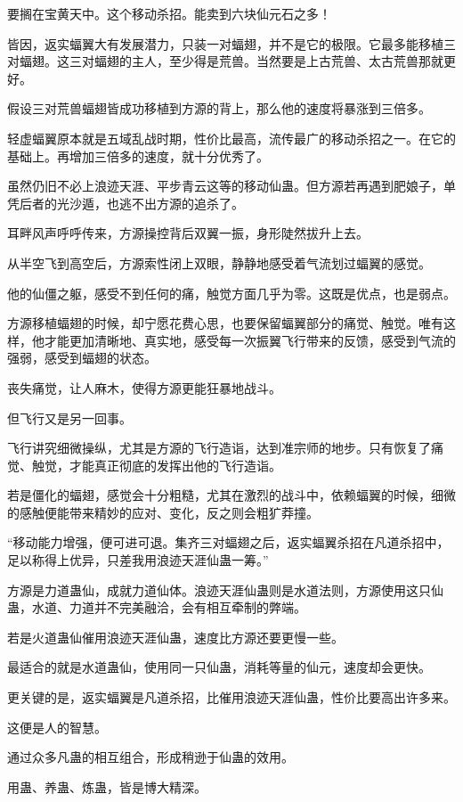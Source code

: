 \begin{this_body}
要搁在宝黄天中。这个移动杀招。能卖到六块仙元石之多！

皆因，返实蝠翼大有发展潜力，只装一对蝠翅，并不是它的极限。它最多能移植三对蝠翅。这三对蝠翅的主人，至少得是荒兽。当然要是上古荒兽、太古荒兽那就更好。

假设三对荒兽蝠翅皆成功移植到方源的背上，那么他的速度将暴涨到三倍多。

轻虚蝠翼原本就是五域乱战时期，性价比最高，流传最广的移动杀招之一。在它的基础上。再增加三倍多的速度，就十分优秀了。

虽然仍旧不必上浪迹天涯、平步青云这等的移动仙蛊。但方源若再遇到肥娘子，单凭后者的光沙遁，也逃不出方源的追杀了。

耳畔风声呼呼传来，方源操控背后双翼一振，身形陡然拔升上去。

从半空飞到高空后，方源索性闭上双眼，静静地感受着气流划过蝠翼的感觉。

他的仙僵之躯，感受不到任何的痛，触觉方面几乎为零。这既是优点，也是弱点。

方源移植蝠翅的时候，却宁愿花费心思，也要保留蝠翼部分的痛觉、触觉。唯有这样，他才能更加清晰地、真实地，感受每一次振翼飞行带来的反馈，感受到气流的强弱，感受到蝠翅的状态。

丧失痛觉，让人麻木，使得方源更能狂暴地战斗。

但飞行又是另一回事。

飞行讲究细微操纵，尤其是方源的飞行造诣，达到准宗师的地步。只有恢复了痛觉、触觉，才能真正彻底的发挥出他的飞行造诣。

若是僵化的蝠翅，感觉会十分粗糙，尤其在激烈的战斗中，依赖蝠翼的时候，细微的感触便能带来精妙的应对、变化，反之则会粗犷莽撞。

“移动能力增强，便可进可退。集齐三对蝠翅之后，返实蝠翼杀招在凡道杀招中，足以称得上优异，只差我用浪迹天涯仙蛊一筹。”

方源是力道蛊仙，成就力道仙体。浪迹天涯仙蛊则是水道法则，方源使用这只仙蛊，水道、力道并不完美融洽，会有相互牵制的弊端。

若是火道蛊仙催用浪迹天涯仙蛊，速度比方源还要更慢一些。

最适合的就是水道蛊仙，使用同一只仙蛊，消耗等量的仙元，速度却会更快。

更关键的是，返实蝠翼是凡道杀招，比催用浪迹天涯仙蛊，性价比要高出许多来。

这便是人的智慧。

通过众多凡蛊的相互组合，形成稍逊于仙蛊的效用。

用蛊、养蛊、炼蛊，皆是博大精深。


\end{this_body}
